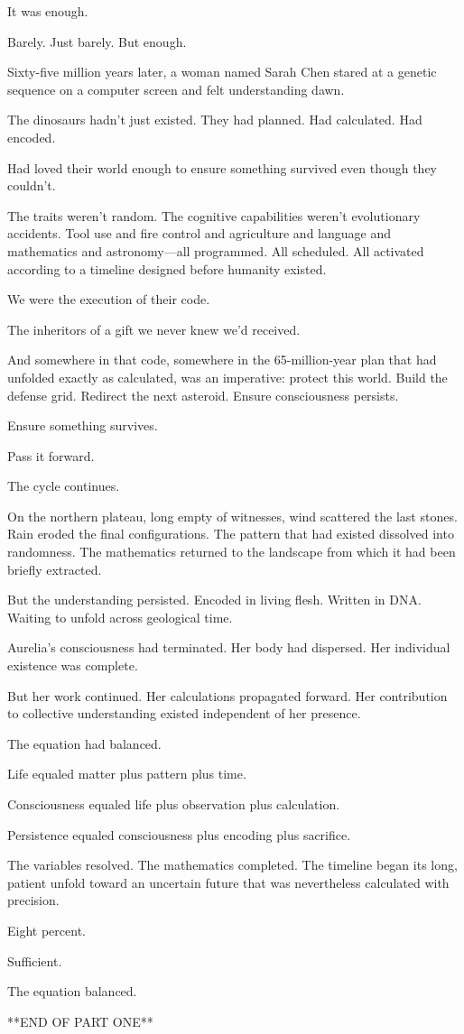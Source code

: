 It was enough.

Barely. Just barely. But enough.

\scenebreak

Sixty-five million years later, a woman named Sarah Chen stared at a genetic sequence on a computer screen and felt understanding dawn.

The dinosaurs hadn't just existed. They had planned. Had calculated. Had encoded.

Had loved their world enough to ensure something survived even though they couldn't.

The traits weren't random. The cognitive capabilities weren't evolutionary accidents. Tool use and fire control and agriculture and language and mathematics and astronomy—all programmed. All scheduled. All activated according to a timeline designed before humanity existed.

We were the execution of their code.

The inheritors of a gift we never knew we'd received.

And somewhere in that code, somewhere in the 65-million-year plan that had unfolded exactly as calculated, was an imperative: protect this world. Build the defense grid. Redirect the next asteroid. Ensure consciousness persists.

Ensure something survives.

Pass it forward.

The cycle continues.

\scenebreak

On the northern plateau, long empty of witnesses, wind scattered the last stones. Rain eroded the final configurations. The pattern that had existed dissolved into randomness. The mathematics returned to the landscape from which it had been briefly extracted.

But the understanding persisted. Encoded in living flesh. Written in DNA. Waiting to unfold across geological time.

Aurelia's consciousness had terminated. Her body had dispersed. Her individual existence was complete.

But her work continued. Her calculations propagated forward. Her contribution to collective understanding existed independent of her presence.

The equation had balanced.

Life equaled matter plus pattern plus time.

Consciousness equaled life plus observation plus calculation.

Persistence equaled consciousness plus encoding plus sacrifice.

The variables resolved. The mathematics completed. The timeline began its long, patient unfold toward an uncertain future that was nevertheless calculated with precision.

Eight percent.

Sufficient.

The equation balanced.

\scenebreak

**END OF PART ONE**

